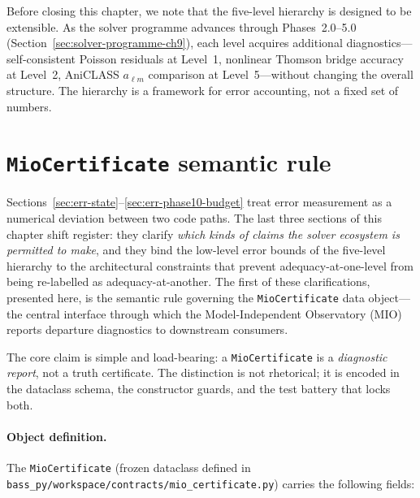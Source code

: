 Before closing this chapter, we note that the five-level
hierarchy is designed to be extensible.  As the solver
programme advances through Phases~2.0--5.0
(Section~\ref{sec:solver-programme-ch9}), each level
acquires additional diagnostics---self-consistent
Poisson residuals at Level~1, nonlinear Thomson bridge
accuracy at Level~2, AniCLASS $a_{\ell m}$ comparison
at Level~5---without changing the overall structure.
The hierarchy is a framework for error accounting, not a
fixed set of numbers.


\section{\texorpdfstring{\texttt{MioCertificate}}{MioCertificate}
         semantic rule}
\label{sec:err-mio-semantic}

Sections~\ref{sec:err-state}--\ref{sec:err-phase10-budget}
treat error measurement as a numerical deviation between two
code paths.  The last three sections of this chapter shift
register: they clarify \emph{which kinds of claims the solver
ecosystem is permitted to make}, and they bind the low-level
error bounds of the five-level hierarchy to the architectural
constraints that prevent adequacy-at-one-level from being
re-labelled as adequacy-at-another.  The first of these
clarifications, presented here, is the semantic rule governing
the \texttt{MioCertificate} data object---the central
interface through which the Model-Independent Observatory
(MIO) reports departure diagnostics to downstream consumers.

The core claim is simple and load-bearing: a
\texttt{MioCertificate} is a \emph{diagnostic report}, not a
truth certificate.  The distinction is not rhetorical; it is
encoded in the dataclass schema, the constructor guards, and
the test battery that locks both.


\paragraph{Object definition.}

The \texttt{MioCertificate} (frozen dataclass defined in
\texttt{bass\_py/workspace/contracts/mio\_certificate.py})
carries the following fields:

